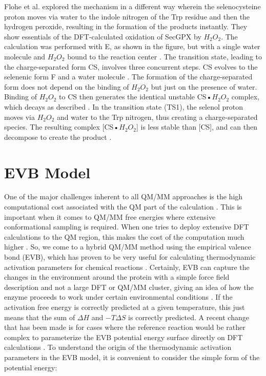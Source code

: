 \documentclass[journal=jacsat,manuscript=article]{achemso}
\begin{document}
Flohe et al. \cite{Orian2015} explored the mechanism in a different way wherein the selenocysteine proton moves via water to the indole nitrogen of the Trp residue and then the hydrogen peroxide, resulting in the formation of the products instantly. They show essentials of the DFT-calculated oxidation of SecGPX by $H_{2} O_{2}$. The calculation was performed with E, as shown in the figure, but with a single water molecule and $H_{2} O_{2}$ bound to the reaction center \cite{Orian2015}. The transition state, leading to the charge-separated form CS, involves three concurrent steps. CS evolves to the selenenic form F and a water molecule \cite{Orian2015}. The formation of the charge-separated form does not depend on the binding of $H_{2} O_{2}$ but just on the presence of water. Binding of $H_{2} O_{2}$ to CS then generates the identical unstable CS•$H_{2} O_{2}$ complex, which decays as described \cite{Orian2015}. In the transition state (TS1), the selenol proton moves via $H_{2} O_{2}$ and water to the Trp nitrogen, thus creating a charge-separated species. The resulting complex [CS•$H_{2} O_{2}$] is less stable than [CS], and can then decompose to create the product \cite{Orian2015}. 

\section{EVB Model}

One of the major challenges inherent to all QM/MM approaches is the high computational cost associated with the QM part of the calculation \cite{Carvalho2014}. This is important when it comes to QM/MM free energies where extensive conformational sampling is required. When one tries to deploy extensive DFT calculations to the QM region, this makes the cost of the computation much higher \cite{Carvalho2014}. So, we come to a hybrid QM/MM method using the empirical valence bond (EVB), which has proven to be very useful for calculating thermodynamic activation parameters for chemical reactions \cite{Oanca2024}. Certainly, EVB can capture the changes in the environment around the protein with a simple force field description and not a large DFT or QM/MM cluster, giving an idea of how the enzyme proceeds to work under certain environmental conditions \cite{Oanca2024}. If the activation free energy is correctly predicted at a given temperature, this just means that the sum of \(\Delta H\) and \(-T\Delta S\) is correctly predicted. A recent change that has been made is for cases where the reference reaction would be rather complex to parameterize the EVB potential energy surface directly on DFT calculations \cite{Oanca2024}. To understand the origin of the thermodynamic activation parameters in the EVB model, it is convenient to consider the simple form of the potential energy:
\end{document}
